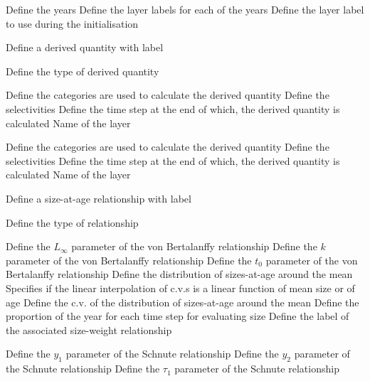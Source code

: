  {Define the years}
 {Define the layer labels for each of the years}
 {Define the layer label to use during the initialisation}
\par{} {Define a derived quantity with label}\par
{} {Define the type of derived quantity}
\par\textbf{}\par
{} {Define the categories are used to calculate the derived quantity}
 {Define the selectivities}
 {Define the time step at the end of which, the derived quantity is calculated}
 {Name of the layer}
\par\textbf{}\par
{} {Define the categories are used to calculate the derived quantity}
 {Define the selectivities}
 {Define the time step at the end of which, the derived quantity is calculated}
 {Name of the layer}
\par{} {Define a size-at-age relationship with label}\par
{} {Define the type of relationship}
\par\textbf{}\par
{} {Define the $L_\infty$ parameter of the von Bertalanffy relationship}
 {Define the $k$ parameter of the von Bertalanffy relationship}
 {Define the $t_0$ parameter of the von Bertalanffy relationship}
 {Define the distribution of sizes-at-age around the mean}
 {Specifies if the linear interpolation of c.v.s is a linear function of mean size or of age}
 {Define the c.v. of the distribution of sizes-at-age around the mean}
 {Define the proportion of the year for each time step for evaluating size}
 {Define the label of the associated size-weight relationship}
\par\textbf{}\par
{} {Define the $y_1$ parameter of the Schnute relationship}
 {Define the $y_2$ parameter of the Schnute relationship}
 {Define the $\tau_1$ parameter of the Schnute relationship}

